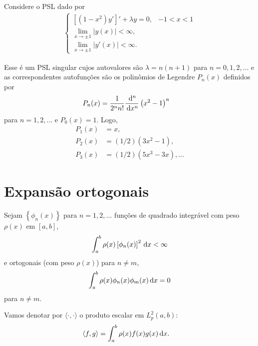 \begin{exem}
    Considere o PSL dado por
    \begin{align*}
        \begin{cases}
            \left[ \left( 1 - x^2 \right) y' \right]' + \lambda y = 0, & -1 < x < 1 \\
            \lim_{x \to \pm 1} | y(x) | < \infty, \\
            \lim_{x \to \pm 1} | y'(x) | < \infty.
        \end{cases}
    \end{align*}

    Esse é um PSL singular cujos autovalores são $\lambda = n \left( n + 1 \right)$ para $n = 0, 1, 2, \ldots$ e as correspondentes autofunções são os polinômios de Legendre $P_n(x)$ definidos por
    \begin{align*}
        P_n(x) &= \frac{1}{2^n n!} \frac{\, \mathrm{d}^n}{\, \mathrm{d}x^n}\left( x^2 - 1 \right)^n
    \end{align*}
    para $n = 1, 2, \ldots$ e $P_0(x) = 1$. Logo,
    \begin{align*}
        P_1(x) &= x, \\
        P_2(x) &= \left( 1/2 \right) \left( 3 x^2 - 1 \right), \\
        P_3(x) &= \left( 1/2 \right) \left( 5 x^3 - 3 x \right), \ldots
    \end{align*}
\end{exem}

\section{Expansão ortogonais}
Sejam $\left\{ \phi_n(x) \right\}$ para $n = 1, 2, \ldots$ funções de quadrado integrável com peso $\rho(x)$ em $[a,b]$,
\begin{align*}
    \int_a^b \rho(x) \left[ \phi_n(x) \right]^2 \, \mathrm{d}x < \infty
\end{align*}
e ortogonais (com peso $\rho(x)$) para $n \neq m$,
\begin{align*}
    \int_a^b \rho(x) \phi_n(x) \phi_m(x) \, \mathrm{d}x = 0
\end{align*}
para $n \neq m$.

Vamos denotar por $\langle \cdot, \cdot \rangle$ o produto escalar em $L_p^2(a, b)$:
\begin{align*}
    \langle f,g \rangle &= \int_a^b \rho(x) f(x) g(x) \, \mathrm{d}x.
\end{align*}

